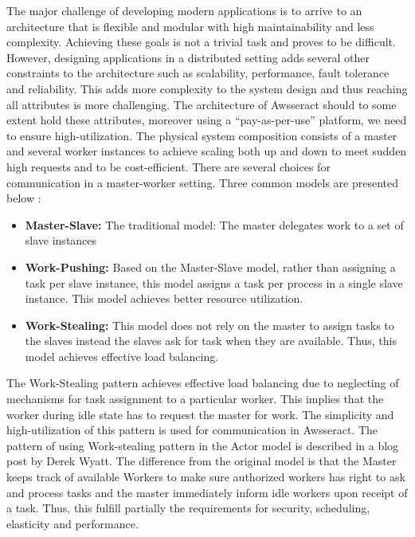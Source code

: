 \documentclass[conference]{IEEEtran}
\begin{document}
The major challenge of developing modern applications is to arrive to an architecture that is flexible and modular with high maintainability and less complexity. Achieving these goals is not a trivial task and proves to be difficult. However, designing applications in a distributed setting adds several other constraints to the architecture such as scalability, performance, fault tolerance and reliability. This adds more complexity to the system design and thus reaching all attributes is more challenging. The architecture of Awsseract should to some extent hold these attributes, moreover using a “pay-as-per-use” platform, we need to ensure high-utilization. The physical system composition consists of a master and several worker instances to achieve scaling both up and down to meet sudden high requests and to be cost-efficient. There are several choices for communication in a master-worker setting. Three common models are presented below \cite{com}: \\



\begin{itemize}
  \item \textbf{Master-Slave:} The traditional model: The master delegates work to a set of slave instances
  \item \textbf{Work-Pushing:} Based on the Master-Slave model, rather than assigning a task per slave instance, this model assigns a task per process in a single slave instance. This model achieves better resource utilization.

  \item \textbf{Work-Stealing:} This model does not rely on the master to assign tasks to the slaves instead the slaves ask for task when they are available. Thus, this model achieves effective load balancing. \\

\end{itemize} 

The Work-Stealing pattern achieves effective load balancing due to neglecting of mechanisms for task assignment to a particular worker. This implies that the worker during idle state has to request the master for work. The simplicity and high-utilization of this pattern is used for communication in Awsseract. The pattern of using Work-stealing pattern in the Actor model is described in a blog post \cite{wyatt} by Derek Wyatt. The difference from the original model is that the Master keeps track of available Workers to make sure authorized workers has right to ask and process tasks and the master immediately inform idle workers upon receipt of a task. Thus, this fulfill partially the requirements for security, scheduling, elasticity and performance.   \\
\end{document}
